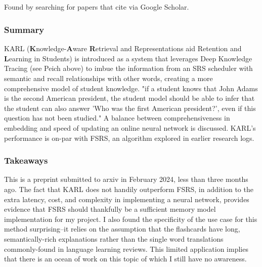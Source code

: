 \documentclass[
	letterpaper, %
]{jdf}
\begin{document}
\subsection{}
Found by searching for papers that cite \cite{important_adaptive_learning_exercise_generation} via Google Scholar.

\subsubsection{Summary}
KARL (\textbf{K}nowledge-\textbf{A}ware \textbf{R}etrieval and Representations aid Retention and \textbf{L}earning in Students) is introduced as a system that leverages Deep Knowledge Tracing (see Peich above) to imbue the information from an SRS scheduler with semantic and recall relationships with other words, creating a more comprehensive model of student knowledge. "if a student knows that John Adams is the second American president, the student model should be able to infer that the student can also answer 'Who was the first American president?', even if this question has not been studied." A balance between comprehensiveness in embedding and speed of updating an online neural network is discussed. KARL's performance is on-par with FSRS, an algorithm explored in earlier research logs.

\subsubsection{Takeaways}
This is a preprint submitted to arxiv in February 2024, less than three months ago. The fact that KARL does not handily outperform FSRS, in addition to the extra latency, cost, and complexity in implementing a neural network, provides evidence that FSRS should thankfully be a sufficient memory model implementation for my project. I also found the specificity of the use case for this method surprising–it relies on the assumption that the flashcards have long, semantically-rich explanations rather than the single word translations commonly-found in language learning reviews. This limited application implies that there is an ocean of work on this topic of which I still have no awareness.
\end{document}
